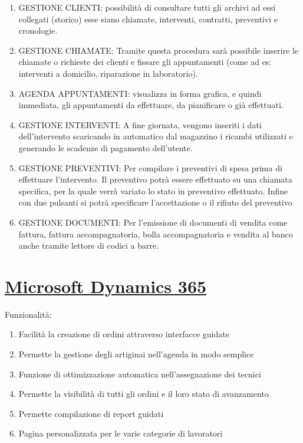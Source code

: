 \documentclass[11pt]{article}
\begin{document}
\begin{enumerate}
  \item GESTIONE CLIENTI: possibilità di consultare tutti gli archivi
    ad essi collegati (storico) esse siano chiamate, interventi,
    contratti, preventivi e cronologie.
  \item GESTIONE CHIAMATE: Tramite questa procedura sarà possibile
    inserire le chiamate o richieste dei clienti e fissare gli
    appuntamenti (come ad es: interventi a domicilio, riparazione in
    laboratorio).
  \item AGENDA APPUNTAMENTI: visualizza in forma grafica, e quindi
    immediata, gli appuntamenti da effettuare, da pianificare o già
    effettuati.
  \item GESTIONE INTERVENTI: A fine giornata, vengono inseriti i
    dati dell'intervento scaricando in automatico dal magazzino i
    ricambi utilizzati e generando le scadenze di pagamento
    dell'utente.
  \item GESTIONE PREVENTIVI: Per compilare i preventivi di spesa prima
    di effettuare l'intervento.  Il preventivo potrà essere effettuato
    su una chiamata specifica, per la quale verrà variato lo stato in
    preventivo effettuato.  Infine con due pulsanti si potrà
    specificare l'accettazione o il rifiuto del preventivo
    \item GESTIONE DOCUMENTI: Per l'emissione di documenti di vendita
      come fattura, fattura accompagnatoria, bolla accompagnatoria e
      vendita al banco anche tramite lettore di codici a barre.
\end{enumerate}


\section{\href{https://dynamics.microsoft.com/it-it/}{Microsoft Dynamics 365}}

Funzionalità:

\begin{enumerate}
  \item Facilità la creazione di ordini attraverso interfacce guidate

  \item Permette la gestione degli artiginai nell'agenda in modo semplice

  \item Funzione di ottimizzazione automatica nell'assegnazione dei tecnici

  \item Permette la visibilità di tutti gli ordini e il loro stato di avanzamento

  \item Permette compilazione di report guidati

  \item Pagina personalizzata per le varie categorie di lavoratori
\end{enumerate}
\end{document}

